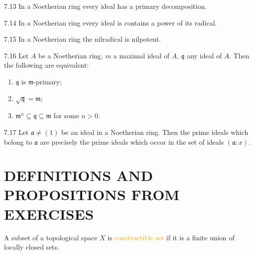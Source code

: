 \begin{proposition}{7.13}
	In a Noetherian ring every ideal has a primary decomposition.
\end{proposition}

\begin{proposition}{7.14}
	In a Noetherian ring every ideal is contains a power of its radical.
\end{proposition}

\begin{corollary}{7.15}
	In a Noetherian ring the nilradical is nilpotent.
\end{corollary}

\begin{corollary}{7.16}
	Let $A$ be a Noetherian ring, $m$ a maximal ideal of $A$, $\mathfrak{q}$ any ideal of $A$. Then the following are equivalent:
	\begin{enumerate}[label=\textup{(\roman*)},ref=\thecorollarytemp(\roman*)]
		\item\label{7.16.1} $\mathfrak{q}$ is $\mathfrak{m}$-primary;
		\item\label{7.16.2} $\sqrt{\mathfrak{q}}=\mathfrak{m}$;
		\item\label{7.16.3} $\mathfrak{m}^n\subseteq\mathfrak{q}\subseteq\mathfrak{m}$ for some $n>0$.
	\end{enumerate}
\end{corollary}

\begin{proposition}{7.17}
	Let $\mathfrak{a}\neq(1)$ be an ideal in a Noetherian ring. Then the prime ideals which belong to $\mathfrak{a}$ are precisely the prime ideals which occor in the set of ideals $(\mathfrak{a}:x)$.
\end{proposition}

\section*{DEFINITIONS AND PROPOSITIONS FROM EXERCISES}

\begin{definition}
	A subset of a topological space $X$ is \textcolor{orange}{constructible set} if it is a finite union of locally closed sets.
\end{definition}